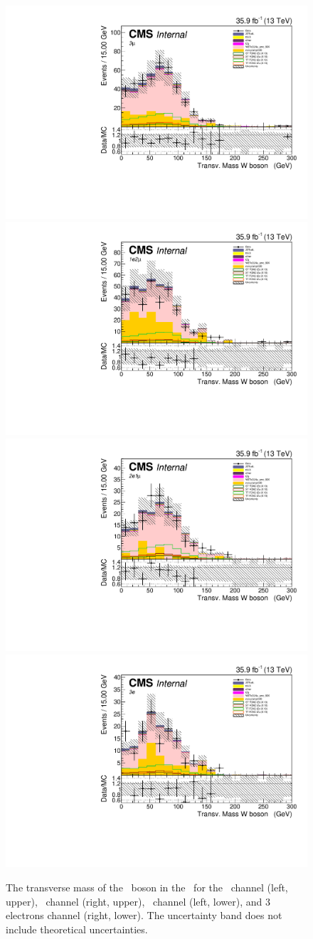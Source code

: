 \begin{figure}[htbp]
	\centering
	\includegraphics[width=0.49\linewidth]{6_Search/Figures/InitialFit/vars/wzcontrol_MVA_mWt_uuu_Stack}
	\includegraphics[width=0.49\linewidth]{6_Search/Figures/InitialFit/vars/wzcontrol_MVA_mWt_uue_Stack}
	\includegraphics[width=0.49\linewidth]{6_Search/Figures/InitialFit/vars/wzcontrol_MVA_mWt_eeu_Stack}
	\includegraphics[width=0.49\linewidth]{6_Search/Figures/InitialFit/vars/wzcontrol_MVA_mWt_eee_Stack}
	\caption{The transverse mass of the \PW\ boson in the \WZCR\ for the \mumumu\ channel (left, upper), \emumu\ channel (right, upper), \eemu\ channel (left, lower), and 3 electrons channel (right, lower). The uncertainty band does not include theoretical uncertainties.}
	\label{fig:mtwstack}
\end{figure}


